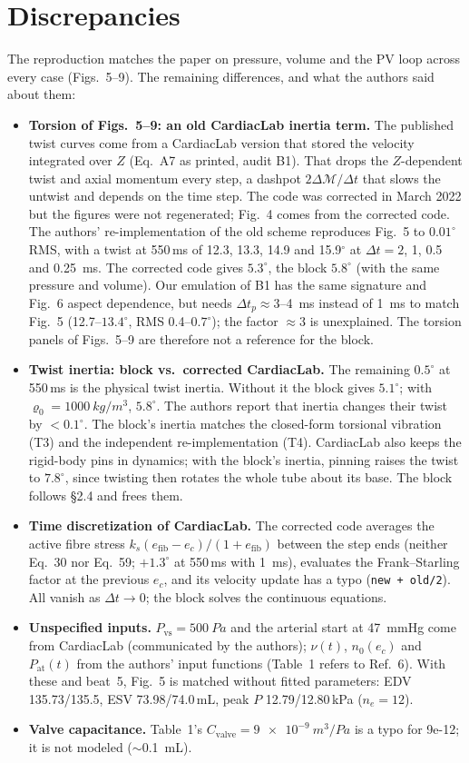 \documentclass[10pt]{article}
\begin{document}
\section*{Discrepancies}
The reproduction matches the paper on pressure, volume and the PV loop across every case
(Figs.~5--9). The remaining differences, and what the authors said about them:
\begin{itemize}
  \item \textbf{Torsion of Figs.~5--9: an old CardiacLab inertia term.} The published twist
  curves come from a CardiacLab version that stored the velocity integrated over $Z$ (Eq.~A7 as
  printed, audit B1). That drops the $Z$-dependent twist and axial momentum every step, a
  dashpot $2\Delta\mathcal M/\Delta t$ that slows the untwist and depends on the time step. The
  code was corrected in March 2022 but the figures were not regenerated; Fig.~4 comes from the
  corrected code. The authors' re-implementation of the old scheme reproduces Fig.~5 to
  $0.01^\circ$ RMS, with a twist at 550\,ms of 12.3, 13.3, 14.9 and 15.9$^\circ$ at
  $\Delta t=2$, 1, 0.5 and \SI{0.25}{ms}. The corrected code gives $5.3^\circ$, the block
  $5.8^\circ$ (with the same pressure and volume). Our emulation of B1 has the same signature
  and Fig.~6 aspect dependence, but needs $\Delta t_p\approx3$--\SI{4}{ms} instead of
  \SI{1}{ms} to match Fig.~5 (12.7--$13.4^\circ$, RMS 0.4--$0.7^\circ$); the factor $\approx3$ is
  unexplained. The torsion panels of Figs.~5--9 are therefore not a reference for the block.
  \item \textbf{Twist inertia: block vs.\ corrected CardiacLab.} The remaining $0.5^\circ$ at
  550\,ms is the physical twist inertia. Without it the block gives $5.1^\circ$; with
  $\varrho_0=\SI{1000}{kg/m^3}$, $5.8^\circ$. The authors report that inertia changes their
  twist by $<0.1^\circ$. The block's inertia matches the closed-form torsional vibration (T3)
  and the independent re-implementation (T4). CardiacLab also keeps the rigid-body pins in
  dynamics; with the block's inertia, pinning raises the twist to $7.8^\circ$, since twisting
  then rotates the whole tube about its base. The block follows \S2.4 and frees them.
  \item \textbf{Time discretization of CardiacLab.} The corrected code averages the active
  fibre stress $k_s(e_\text{fib}-e_c)/(1+e_\text{fib})$ between the step ends (neither Eq.~30 nor
  Eq.~59; $+1.3^\circ$ at 550\,ms with \SI{1}{ms}), evaluates the Frank--Starling factor at the
  previous $e_c$, and its velocity update has a typo (\texttt{new + old/2}). All vanish as
  $\Delta t\to0$; the block solves the continuous equations.
  \item \textbf{Unspecified inputs.} $P_\text{vs}=\SI{500}{Pa}$ and the arterial start at
  \SI{47}{mmHg} come from CardiacLab (communicated by the authors); $\nu(t)$, $n_0(e_c)$ and
  $P_\text{at}(t)$ from the authors' input functions (Table~1 refers to Ref.~6). With these and
  beat~5, Fig.~5 is matched without fitted parameters: EDV 135.73/135.5, ESV 73.98/74.0\,mL,
  peak $P$ 12.79/12.80\,kPa ($n_e=12$).
  \item \textbf{Valve capacitance.} Table~1's $C_\text{valve}=\SI{9e-9}{m^3/Pa}$ is a typo for
  9e-12; it is not modeled ($\sim$\SI{0.1}{mL}).
\end{itemize}
\end{document}
